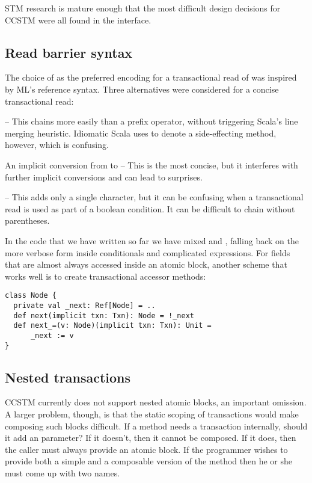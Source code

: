 
STM research is mature enough that the most difficult design decisions
for CCSTM were all found in the interface.

\subsection{Read barrier syntax}

The choice of  as the preferred encoding for a transactional
read of  was inspired by ML's reference syntax.  Three alternatives
were considered for a concise transactional read:
\begin{packed_enum}
\item {} -- This chains more easily than a prefix operator, without
triggering Scala's line merging heuristic.  Idiomatic Scala uses \code{()} to
denote a side-effecting method, however, which is confusing.
\item An implicit conversion from  to  -- This is
the most concise, but it interferes with further implicit conversions and
can lead to surprises.
\item {} -- This adds only a single character, but it can be
confusing when a transactional read is used as part of a boolean condition.
It can be difficult to chain without parentheses.
\end{packed_enum}

In the code that we have written so far we have mixed  and
, falling back on the more verbose form inside conditionals and
complicated expressions.  For fields that are almost always accessed inside
an atomic block, another scheme that works well is to create transactional
accessor methods:
\lstset{numbers=none}
\begin{lstlisting}
class Node {
  private val _next: Ref[Node] = ..
  def next(implicit txn: Txn): Node = !_next
  def next_=(v: Node)(implicit txn: Txn): Unit =
      _next := v
}
\end{lstlisting}
\lstset{numbers=left}

\subsection{Nested transactions}

CCSTM currently does not support nested atomic blocks, an important
omission.  A larger problem, though, is that the static scoping
of transactions would make composing such blocks difficult.  If a
method  needs a transaction internally, should it add an
  parameter?  If it doesn't, then it
cannot be composed.  If it does, then the caller must always provide
an atomic block.  If the programmer wishes to provide both a simple
and a composable version of the method then he or she must come up with
two names.

